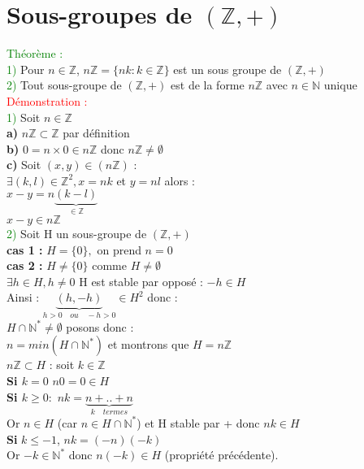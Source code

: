 \documentclass{article}
\begin{document}
\section{Sous-groupes de $(\mathbb{Z},+)$}
\textcolor{green}{Théorème :} \\ 
\textcolor{green}{1)} Pour $n \in \mathbb{Z}$, $n\mathbb{Z}=\lbrace nk : k \in \mathbb{Z} \rbrace$ est un sous groupe de $(\mathbb{Z},+)$ \\ 
\textcolor{green}{2)} Tout sous-groupe de $( \mathbb{Z},+)$ est de la forme $n \mathbb{Z}$ avec $n \in \mathbb{N}$ unique \\ 
\textcolor{red}{Démonstration :} \\ 
\textcolor{green}{1)} Soit $n \in \mathbb{Z}$ \\ 
{\bf a)} $n\mathbb{Z} \subset \mathbb{Z}$ par définition \\ 
{\bf b)} $0=n \times 0 \in n \mathbb{Z}$ donc $n \mathbb{Z} \neq \emptyset$ \\ 
{\bf c)} Soit $(x,y) \in (n \mathbb{Z})$ : \\ 
$\exists (k,l) \in \mathbb{Z}^2,x=nk$ et $y=nl$ alors : \\ 
$x-y = n\underbrace{(k-l)}_{\in \mathbb{Z}}$ \\ 
$x-y \in n\mathbb{Z}$ \\ 
\textcolor{green}{2)} Soit H un sous-groupe de $(\mathbb{Z},+)$ \\ 
{\bf cas 1 :} $H= \lbrace 0 \rbrace,$ on prend $n=0$ \\ 
{\bf cas 2 : } $H \neq \lbrace 0 \rbrace$ comme $H \neq \emptyset$ \\ 
$\exists h \in H , h \neq 0$  H est stable par opposé : $-h \in H$ \\
Ainsi : $\underbrace{(h,-h)}_{h>0 \quad ou \quad -h>0} \in H^2$ donc :\\
$H \cap \mathbb{N}^\ast\neq \emptyset$ posons donc : \\ 
$n= min(H \cap \mathbb{N}^\ast)$ et montrons que $H=n\mathbb{Z}$ \\ 
\underline{$n\mathbb{Z} \subset H$} : soit $k \in \mathbb{Z}$ \\ 
{\bf Si $k=0$} $n0=0 \in H$ \\ 
{\bf Si $k \geq 0:$} $nk= \underbrace{n+..+n}_{k \quad termes}$ \\
Or $n \in H$ (car $n \in H \cap \mathbb{N}^\ast$) et H stable par + donc $nk \in H$ \\ 
{\bf Si} $k\leq-1$, $nk=(-n)(-k)$  \\ 
Or $-k \in \mathbb{N}^\ast$ donc $n(-k) \in H $ (propriété précédente). \\ 
\end{document}
